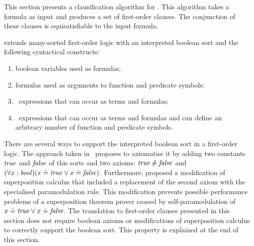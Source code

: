 This section presents a clausification algorithm for \folb{}. This algorithm takes a \folb{} formula as input and produces a set of first-order clauses. The conjunction of these clauses is equisatisfiable to the input formula.

\folb{} extends many-sorted first-order logic with an interpreted boolean sort and the following syntactical constructs:
\begin{enumerate}
  \item boolean variables used as formulas;
  \item formulas used as arguments to function and predicate symbols;
  \item \ITE\ expressions that can occur as terms and formulas;
  \item \LETIN\ expressions that can occur as terms and formulas and can define an arbitrary number of function and predicate symbols.
\end{enumerate}

There are several ways to support the interpreted boolean sort in a first-order logic. The approach taken in~\cite{FOOL} proposes to axiomatise it by adding two constants $\mathit{true}$ and $\mathit{false}$ of this sorts and two axioms: $\mathit{true} \not\doteq \mathit{false}$ and $(\forall x:\mathit{bool})(x \doteq \mathit{true} \lor x \doteq \mathit{false})$. Furthermore, \cite{FOOL} proposed a modification of superposition calculus that included a replacement of the second axiom with the specialised \folb{} paramodulation rule. This modification prevents possible performance problems of a superposition theorem prover caused by self-paramodulation of $x \doteq \mathit{true} \lor x \doteq \mathit{false}$. The translation to first-order clauses presented in this section does not require boolean axioms or modifications of superposition calculus to correctly support the boolean sort. This property is explained at the end of this section.

